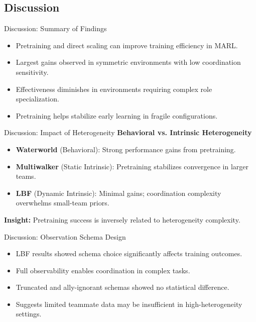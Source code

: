 \subsection{Discussion}

\begin{frame}{Discussion: Summary of Findings}
    \begin{itemize}
        \item Pretraining and direct scaling can improve training efficiency in MARL.
        \item Largest gains observed in symmetric environments with low coordination sensitivity.
        \item Effectiveness diminishes in environments requiring complex role specialization.
        \item Pretraining helps stabilize early learning in fragile configurations.
    \end{itemize}
\end{frame}

\begin{frame}{Discussion: Impact of Heterogeneity}
    \textbf{Behavioral vs. Intrinsic Heterogeneity}
    \begin{itemize}
        \item \textbf{Waterworld} (Behavioral): Strong performance gains from pretraining.
        \item \textbf{Multiwalker} (Static Intrinsic): Pretraining stabilizes convergence in larger teams.
        \item \textbf{LBF} (Dynamic Intrinsic): Minimal gains; coordination complexity overwhelms small-team priors.
    \end{itemize}
    \vspace{1em}
    \textbf{Insight:} Pretraining success is inversely related to heterogeneity complexity.
\end{frame}

\begin{frame}{Discussion: Observation Schema Design}
    \begin{itemize}
        \item LBF results showed schema choice significantly affects training outcomes.
        \item Full observability enables coordination in complex tasks.
        \item Truncated and ally-ignorant schemas showed no statistical difference.
        \item Suggests limited teammate data may be insufficient in high-heterogeneity settings.
    \end{itemize}
\end{frame}

